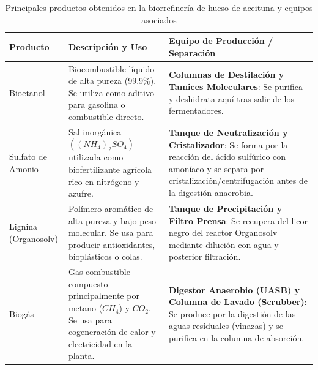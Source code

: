 \documentclass{report}
\begin{document}
\begin{table}[h]
\centering

\label{tab:productos_biorrefineria}
\begin{tabular}{|l|p{5cm}|p{6cm}|}
\hline
\textbf{Producto} & \textbf{Descripción y Uso} & \textbf{Equipo de Producción / Separación} \\ \hline
Bioetanol & Biocombustible líquido de alta pureza (99.9\%). Se utiliza como aditivo para gasolina o combustible directo. & \textbf{Columnas de Destilación y Tamices Moleculares}: Se purifica y deshidrata aquí tras salir de los fermentadores. \\ \hline
Sulfato de Amonio & Sal inorgánica $((NH_4)_2SO_4)$ utilizada como biofertilizante agrícola rico en nitrógeno y azufre. & \textbf{Tanque de Neutralización y Cristalizador}: Se forma por la reacción del ácido sulfúrico con amoníaco y se separa por cristalización/centrifugación antes de la digestión anaerobia. \\ \hline
Lignina (Organosolv) & Polímero aromático de alta pureza y bajo peso molecular. Se usa para producir antioxidantes, bioplásticos o colas. & \textbf{Tanque de Precipitación y Filtro Prensa}: Se recupera del licor negro del reactor Organosolv mediante dilución con agua y posterior filtración. \\ \hline
Biogás & Gas combustible compuesto principalmente por metano ($CH_4$) y $CO_2$. Se usa para cogeneración de calor y electricidad en la planta. & \textbf{Digestor Anaerobio (UASB) y Columna de Lavado (Scrubber)}: Se produce por la digestión de las aguas residuales (vinazas) y se purifica en la columna de absorción. \\ \hline
\end{tabular}
\caption{Principales productos obtenidos en la biorrefinería de hueso de aceituna y equipos asociados}
\end{table}
\chapter{}
\end{document}
